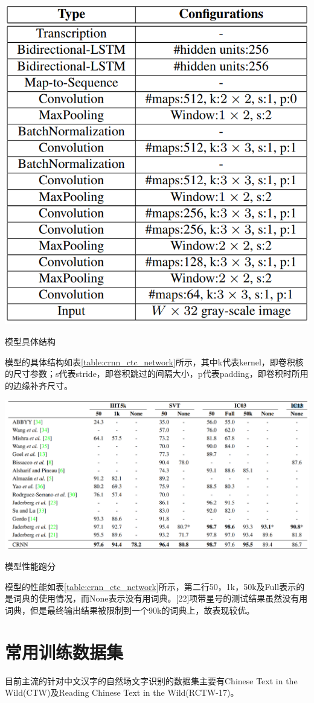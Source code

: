 \documentclass[12pt,a4paper]{ctexart}
\begin{document}
\begin{table}[H]
		\centering
	\includegraphics[width=0.6\linewidth]{images/crnn_ctc_network}
	\caption{模型具体结构}
	\label{table:crnn_ctc_network}
\end{table}
模型的具体结构如表\ref{table:crnn_ctc_network}所示，其中k代表kernel，即卷积核的尺寸参数；s代表stride，即卷积跳过的间隔大小，p代表padding，即卷积时所用的边缘补齐尺寸。
\begin{table}[H]
	\centering
	\includegraphics[width=1\linewidth]{images/crnn_ctc_performance}
	\caption{模型性能跑分}
	\label{table:crnn_ctc_performance}
\end{table}
模型的性能如表\ref{table:crnn_ctc_network}所示，第二行50，1k，50k及Full表示的是词典的使用情况，而None表示没有用词典。[22]项带星号的测试结果虽然没有用词典，但是最终输出结果被限制到一个90k的词典上，故表现较优。

\section{常用训练数据集}
目前主流的针对中文汉字的自然场文字识别的数据集主要有Chinese Text in the Wild(CTW)\cite{CTW}及Reading Chinese Text in the Wild(RCTW-17)\cite{RCTW-17}。
\end{document}
